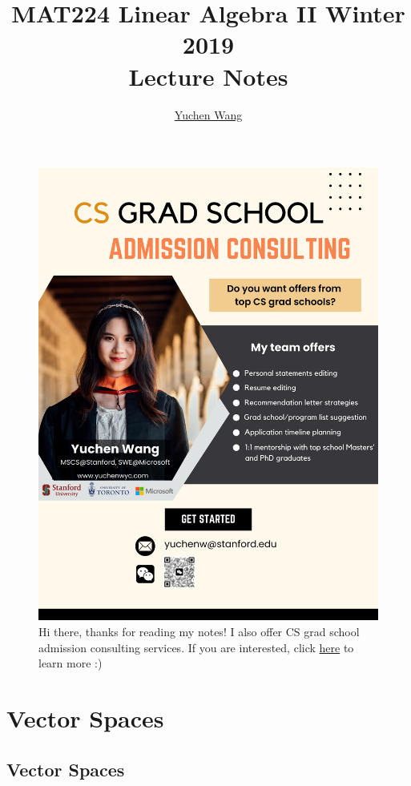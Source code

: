 \documentclass[11pt]{article}
\title{MAT224 Linear Algebra II Winter 2019\\ Lecture Notes}
\author{\textcolor{blue}{\href{https://www.yuchenwyc.com}{Yuchen Wang}}}
\begin{document}
	\maketitle
	\tableofcontents
	\newpage
	
\begin{figure}[h]
	\centering
	\includegraphics[scale=0.21]{../ad.png}
	\caption{Hi there, thanks for reading my notes! I also offer CS grad school admission consulting services. If you are interested, click \textcolor{blue}{\href{https://www.yuchenwyc.com/files/admission_consulting.pdf}{here}} to learn more :)}
\end{figure}
	\section{Vector Spaces}
	\subsection{Vector Spaces}
\end{document}
